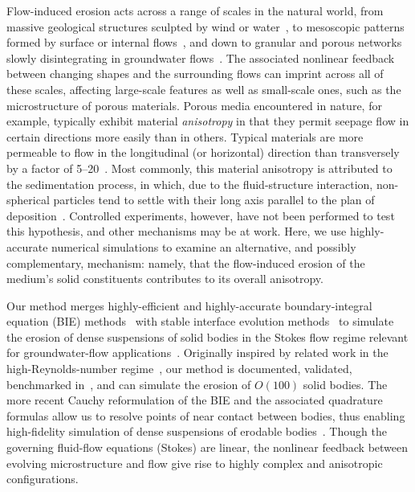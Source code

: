 \documentclass[3p]{elsarticle}
\begin{document}
Flow-induced erosion acts across a range of scales in the natural world, from massive geological structures sculpted by wind or water~\cite{abrams2009growth, perkins2015amplification, mac2020ultra, sharma2022alcove, mac2022morphological}, to mesoscopic patterns formed by surface or internal flows~\cite{berhanu2012shape, bertagni2021hydrodynamic, weady2022anomalous}, and down to granular and porous networks slowly disintegrating in groundwater flows~\cite{chiu2020viscous, szymczak2009wormhole, jager2017channelization, grodzki2019reactive, bizmark2020multiscale, derr2020flow, zareei2022temporal}. The associated nonlinear feedback between changing shapes and the surrounding flows can imprint across all of these scales, affecting large-scale features as well as small-scale ones, such as the microstructure of porous materials. Porous media encountered in nature, for example, typically exhibit material {\em anisotropy} in that they permit seepage flow in certain directions more easily than in others. Typical materials are more permeable to flow in the longitudinal (or horizontal) direction than transversely by a factor of 5--20~\cite{bear1988dynamics, anderson2015applied}. Most commonly, this material anisotropy is attributed to the sedimentation process, in which, due to the fluid-structure interaction, non-spherical particles tend to settle with their long axis parallel to the plan of deposition~\cite{bear1988dynamics}. Controlled experiments, however, have not been performed to test this hypothesis, and other mechanisms may be at work. Here, we use highly-accurate numerical simulations to examine an alternative, and possibly complementary, mechanism: namely, that the flow-induced erosion of the medium's solid constituents contributes to its overall anisotropy.

Our method merges highly-efficient and highly-accurate boundary-integral equation (BIE) methods~\cite{baker1986boundary, moore2007evaluation} with stable interface evolution methods~\cite{hou-low-she1994, Moore2013} to simulate the erosion of dense suspensions of solid bodies in the Stokes flow regime relevant for groundwater-flow applications~\cite{quaife2018boundary, chiu2020viscous}. Originally inspired by related work in the high-Reynolds-number regime~\cite{Ristroph2012, Moore2013, Huang2015, MooreCPAM2017}, our method is documented, validated, benchmarked in~\cite{quaife2018boundary}, and can simulate the erosion of $O(100)$ solid bodies. The more recent Cauchy reformulation of the BIE and the associated quadrature formulas allow us to resolve points of near contact between bodies, thus enabling high-fidelity simulation of dense suspensions of erodable bodies~\cite{chiu2020viscous}. Though the governing fluid-flow equations (Stokes) are linear, the nonlinear feedback between evolving microstructure and flow give rise to highly complex and anisotropic configurations.
	
\end{document}
